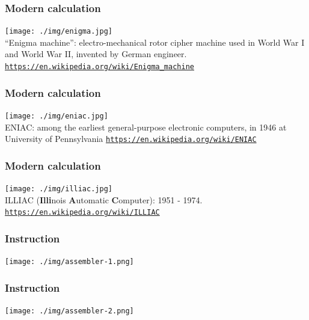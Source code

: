 \documentclass[11pt]{beamer}
\begin{document}
\fi


\begin{frame}[fragile]
  \frametitle{Modern calculation}

  \texttt{[image: ./img/enigma.jpg]}\\
   {\small ``Enigma machine'': electro-mechanical rotor cipher machine used in World War I and World War II, invented by German engineer.}
     \textcolor{\CSBase}{\small \texttt{\url{https://en.wikipedia.org/wiki/Enigma\_machine}}}
\end{frame}

\begin{frame}[fragile]
  \frametitle{Modern calculation}

  \texttt{[image: ./img/eniac.jpg]}\\
  {\small ENIAC: among the earliest general-purpose electronic computers, in 1946 at University of Pennsylvania}
   \textcolor{\CSBase}{\small \texttt{\url{https://en.wikipedia.org/wiki/ENIAC}}}
\end{frame}

\begin{frame}[fragile]
	\frametitle{Modern calculation}
	
	\texttt{[image: ./img/illiac.jpg]}\\
	{\small ILLIAC ({\bf Illi}nois {\bf A}utomatic {\bf C}omputer): 1951 - 1974. }
	\textcolor{\CSBase}{\small \texttt{\url{https://en.wikipedia.org/wiki/ILLIAC}}}
\end{frame}

\iffalse
\begin{frame}[fragile]
  \frametitle{Instruction}

  \texttt{[image: ./img/assembler-1.png]}
\end{frame}

\begin{frame}[fragile]
  \frametitle{Instruction}

  \texttt{[image: ./img/assembler-2.png]}
\end{frame}
\end{document}
